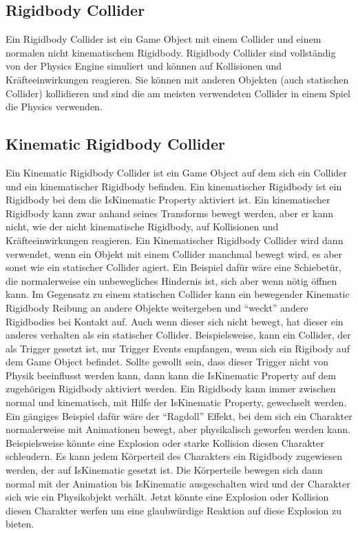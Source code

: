 \subsection{Rigidbody Collider}
Ein Rigidbody Collider ist ein Game Object mit einem Collider und einem normalen nicht kinematischem Rigidbody. Rigidbody Collider sind vollständig von der Physics Engine simuliert und können auf Kollisionen und Kräfteeinwirkungen reagieren. Sie können mit anderen Objekten (auch statischen Collider) kollidieren und sind die am meisten verwendeten Collider in einem Spiel die Physics verwenden.

\subsection{Kinematic Rigidbody Collider}
Ein Kinematic Rigidbody Collider ist ein Game Object auf dem sich ein Collider und ein kinematischer Rigidbody befinden. Ein kinematischer Rigidbody ist ein Rigidbody bei dem die IsKinematic Property aktiviert ist. Ein kinematischer Rigidbody kann zwar anhand seines Transforms bewegt werden, aber er kann nicht, wie der nicht kinematische Rigidbody, auf Kollisionen und Kräfteeinwirkungen reagieren. Ein Kinematischer Rigidbody Collider wird dann verwendet, wenn ein Objekt mit einem Collider manchmal bewegt wird, es aber sonst wie ein statischer Collider agiert.
Ein Beispiel dafür wäre eine Schiebetür, die normalerweise ein unbewegliches Hindernis ist, sich aber wenn nötig öffnen kann. Im Gegensatz zu einem statischen Collider kann ein bewegender Kinematic Rigidbody Reibung an andere Objekte weitergeben und "`weckt"' andere Rigidbodies bei Kontakt auf.
Auch wenn dieser sich nicht bewegt, hat dieser ein anderes verhalten als ein statischer Collider. Beispielsweise, kann ein Collider, der als Trigger gesetzt ist, nur Trigger Events empfangen, wenn sich ein Rigibody auf dem Game Object befindet. Sollte gewollt sein, dass dieser Trigger nicht von Physik beeinflusst werden kann, dann kann die IsKinematic Property auf dem zugehörigen Rigidbody aktiviert werden. Ein Rigidbody kann immer zwischen normal und kinematisch, mit Hilfe der IsKinematic Property, gewechselt werden. Ein gängiges Beispiel dafür wäre der "`Ragdoll"' Effekt, bei dem sich ein Charakter normalerweise mit Animationen bewegt, aber physikalisch geworfen werden kann. Beispielsweise könnte eine Explosion oder starke Kollision diesen Charakter schleudern. Es kann jedem Körperteil des Charakters ein Rigidbody zugewiesen werden, der auf IsKinematic gesetzt ist. Die Körperteile bewegen sich dann normal mit der Animation bis IsKinematic ausgeschalten wird und der Charakter sich wie ein Physikobjekt verhält. Jetzt könnte eine Explosion oder Kollision diesen Charakter werfen um eine glaubwürdige Reaktion auf diese Explosion zu bieten.

\cite{_staticCollider}
